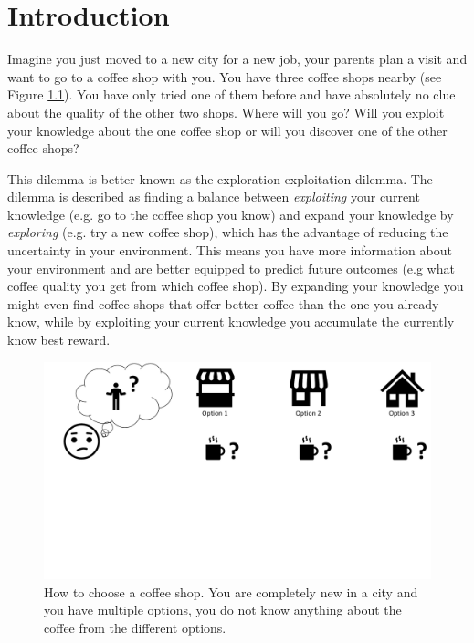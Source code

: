 %
\chapter{Introduction}
Imagine you just moved to a new city for a new job, your parents plan a visit and want to go to a coffee shop with you. You have three coffee shops nearby (see Figure \ref{fig:Coffe_Example}). You have only tried one of them before and have absolutely no clue about the quality of the other two shops. Where will you go? Will you exploit your knowledge about the one coffee shop or will you discover one of the other coffee shops?


This dilemma is better known as the exploration-exploitation dilemma. The dilemma is described as finding a balance between \textit{exploiting} your current knowledge (e.g. go to the coffee shop you know) and expand your knowledge by \textit{exploring} (e.g. try a new coffee shop), which has the advantage of reducing the uncertainty in your environment. This means you have more information about your environment and are better equipped to predict future outcomes (e.g what coffee quality you get from which coffee shop). By expanding your knowledge you might even find coffee shops that offer better coffee than the one you already know, while by exploiting your current knowledge you accumulate the currently know best reward.  
\begin{figure}
    \centering
    \includegraphics[width=1\textwidth]{Plots/CoffeExample.pdf}
    \vspace{-4cm}
    \caption[Coffe Shop Example]{How to choose a coffee shop. You are completely new in a city and you have multiple options, you do not know anything about the coffee from the different options.}
    \label{fig:Coffe_Example}
\end{figure}



